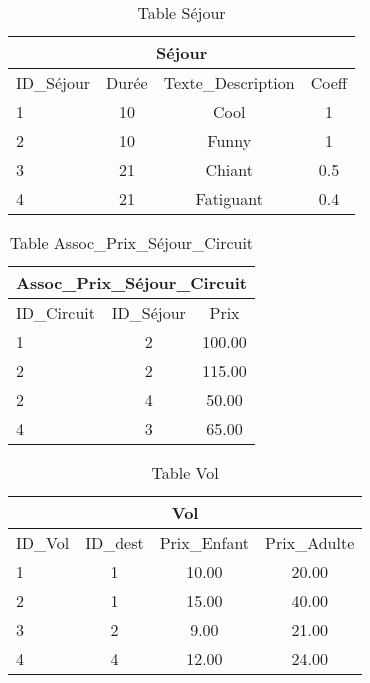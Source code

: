 \documentclass[10pt]{article}
\begin{document}

\begin{table}[h]
\begin{center}
\begin{tabular}{|l|c|c|c|}
\hline
\multicolumn{4}{|c|}{Séjour}\\
\hline
ID\_Séjour& Durée & Texte\_Description& Coeff\\
\hline
1 & 10& Cool & 1\\
\hline
2 & 10& Funny& 1\\
\hline
3 & 21& Chiant& 0.5\\
\hline
4 & 21& Fatiguant& 0.4\\
\hline
\end{tabular}
\end{center}
\caption{Table Séjour}
\end{table}


\begin{table}[h]
\begin{center}
\begin{tabular}{|l|c|c|}
\hline
\multicolumn{3}{|c|}{Assoc\_Prix\_Séjour\_Circuit}\\
\hline
ID\_Circuit& ID\_Séjour & Prix\\
\hline
1 & 2& 100.00\\
\hline
2 & 2& 115.00\\
\hline
2 & 4& 50.00\\
\hline
4 & 3& 65.00\\
\hline
\end{tabular}
\end{center}
\caption{Table Assoc\_Prix\_Séjour\_Circuit}
\end{table}
\newpage

\begin{table}[h]
\begin{center}
\begin{tabular}{|l|c|c|c|}
\hline
\multicolumn{4}{|c|}{Vol}\\
\hline
ID\_Vol& ID\_dest & Prix\_Enfant& Prix\_Adulte\\
\hline
1 & 1& 10.00 & 20.00\\
\hline
2 & 1& 15.00& 40.00\\
\hline
3 & 2& 9.00& 21.00\\
\hline
4 & 4& 12.00& 24.00\\
\hline
\end{tabular}
\end{center}
\caption{Table Vol}
\end{table}
\end{document}
